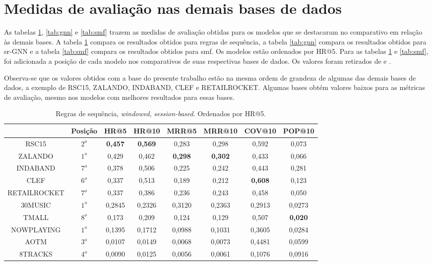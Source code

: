 \section{Medidas de avaliação nas demais bases de dados}
As tabelas \ref{tab:sr}, \ref{tab:gnn} e \ref{tab:smf} trazem as medidas de
avaliação obtidas para os modelos que se destacaram no comparativo em relação às
demais bases. A tabela \ref{tab:sr} compara os resultados obtidos para regras de
sequência, a tabela \ref{tab:gnn} compara os resultados obtidos para sr-GNN e a
tabela \ref{tab:smf} compara os resultados obtidos para smf. Os modelos estão
ordenados por HR@5. Para as tabelas \ref{tab:sr} e \ref{tab:smf}, foi adicionada
a posição de cada modelo nos comparativos de suas respectivas bases de dados. Os
valores foram retirados de \citet{ludewig2020advances} e
\citet{shehzad2024performance}.

Observa-se que os valores obtidos com a base do presente trabalho estão na mesma
ordem de grandeza de algumas das demais bases de dados, a exemplo de RSC15,
ZALANDO, INDABAND, CLEF e RETAILROCKET. Algumas bases obtém
valores baixos para as métricas de avaliação, mesmo nos modelos com melhores
resultados para essas bases.

\begin{table}
\centering
\vspace{1mm}
\begin{tabular}{cccccccc}
\hline
 & Posição & HR@5 & HR@10 & MRR@5 & MRR@10 & COV@10 & POP@10 \\
\hline
RSC15& $2^o$ & \textbf{0,457} & \textbf{0,569} & 0,283 & 0,298 & 0,592 & 0,073 \\
ZALANDO& $1^o$ & 0,429 & 0,462 & \textbf{0,298} & \textbf{0,302} & 0,433 & 0,066 \\
INDABAND& $7^o$ & 0,378 & 0,506 & 0,225 & 0,242 & 0,443 & 0,281 \\
CLEF& $6^o$ & 0,337 & 0,513 & 0,189 & 0,212 & \textbf{0,608} & 0,123 \\
RETAILROCKET& $7^o$ &  0,337 & 0,386 & 0,236 & 0,243 & 0,458 & 0,050 \\
30MUSIC& $1^o$ & 0,2845 & 0,2326 & 0,3120  & 0,2363 & 0,2913 & 0,0273 \\
TMALL& $8^o$ &  0,173 & 0,209 & 0,124 & 0,129 & 0,507 & \textbf{0,020} \\
NOWPLAYING& $1^o$ & 0,1395 & 0,1712 & 0,0988 & 0,1031 & 0,3605 & 0,0284 \\
AOTM& $3^o$ & 0,0107 & 0,0149 & 0,0068 & 0,0073 & 0,4481 & 0,0599 \\
8TRACKS& $4^o$ & 0,0090 & 0,0125 & 0,0056 & 0,0061 & 0,1076 & 0,0916 \\
\hline
\end{tabular}
\caption{Regras de sequência, \textit{windowed}, \textit{session-based}. Ordenados por HR@5.}
\label{tab:sr}
\end{table}

